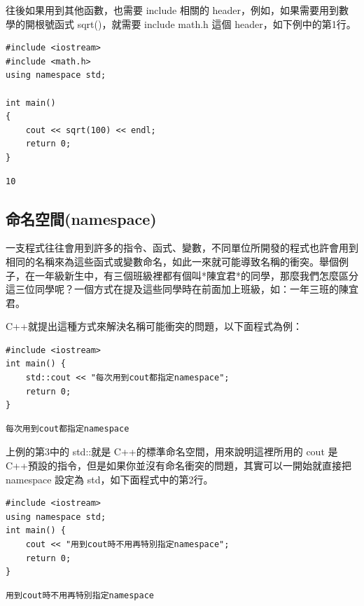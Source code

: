 \documentclass[12pt,a4paper]{article}
\begin{document}
往後如果用到其他函數，也需要 include 相關的 header，例如，如果需要用到數學的開根號函式 sqrt()，就需要 include math.h 這個 header，如下例中的第1行。
\lstset{breaklines=true,language=cpp,label= ,caption= ,captionpos=b,firstnumber=1,numbers=left}
\begin{lstlisting}
#include <iostream>
#include <math.h>
using namespace std;

int main()
{
    cout << sqrt(100) << endl;
    return 0;
}

\end{lstlisting}

\begin{verbatim}
10
\end{verbatim}
\subsection{命名空間(namespace)}
\label{sec:org8e91787}
一支程式往往會用到許多的指令、函式、變數，不同單位所開發的程式也許會用到相同的名稱來為這些函式或變數命名，如此一來就可能導致名稱的衝突。舉個例子，在一年級新生中，有三個班級裡都有個叫*陳宜君*的同學，那麼我們怎麼區分這三位同學呢？一個方式在提及這些同學時在前面加上班級，如：一年三班的陳宜君。

C++就提出這種方式來解決名稱可能衝突的問題，以下面程式為例：
\lstset{breaklines=true,language=cpp,label= ,caption= ,captionpos=b,firstnumber=1,numbers=left}
\begin{lstlisting}
#include <iostream>
int main() {
    std::cout << "每次用到cout都指定namespace";
    return 0;
}
\end{lstlisting}

\begin{verbatim}
每次用到cout都指定namespace
\end{verbatim}


上例的第3中的 std::就是 C++的標準命名空間，用來說明這裡所用的 cout 是 C++預設的指令，但是如果你並沒有命名衝突的問題，其實可以一開始就直接把 namespace 設定為 std，如下面程式中的第2行。
\lstset{breaklines=true,language=cpp,label= ,caption= ,captionpos=b,firstnumber=1,numbers=left}
\begin{lstlisting}
#include <iostream>
using namespace std;
int main() {
    cout << "用到cout時不用再特別指定namespace";
    return 0;
}
\end{lstlisting}

\begin{verbatim}
用到cout時不用再特別指定namespace
\end{verbatim}
\end{document}
